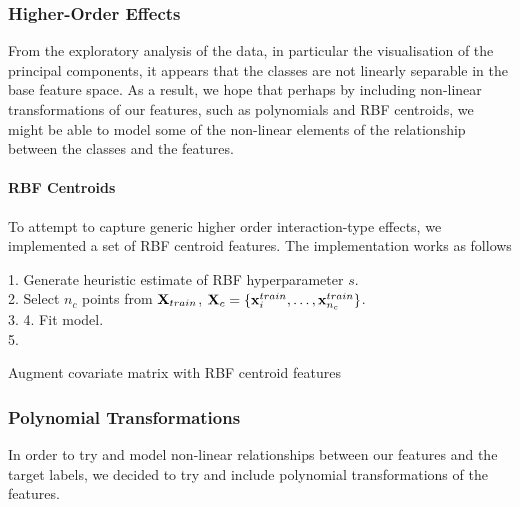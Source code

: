 \subsubsection{Higher-Order Effects}
From the exploratory analysis of the data, in particular the visualisation of the principal components, it appears that the classes are not linearly separable in the base feature space. As a result, we hope that perhaps by including non-linear transformations of our features, such as polynomials and RBF centroids, we might be able to model some of the non-linear elements of the relationship between the classes and the features.

\paragraph{RBF Centroids}
To attempt to capture generic higher order interaction-type effects, we implemented a set of RBF centroid features. The implementation works as follows \newline
\begin{algorithm}[H]
    1. Generate heuristic estimate of RBF hyperparameter $s$.\\
    2. Select $n_c$ points from $\mathbf{X}_{train}$, $\mathbf{X}_c = \{\mathbf{x}^{train}_i, \dots, \mathbf{x}^{train}_{n_c}\}$.\\
    3.  
    4. Fit model.\\
    5. 
    \caption{Augment covariate matrix with RBF centroid features}
\end{algorithm}

\subsubsection{Polynomial Transformations}
In order to try and model non-linear relationships between our features and the target labels, we decided to try and include polynomial transformations of the features. 

